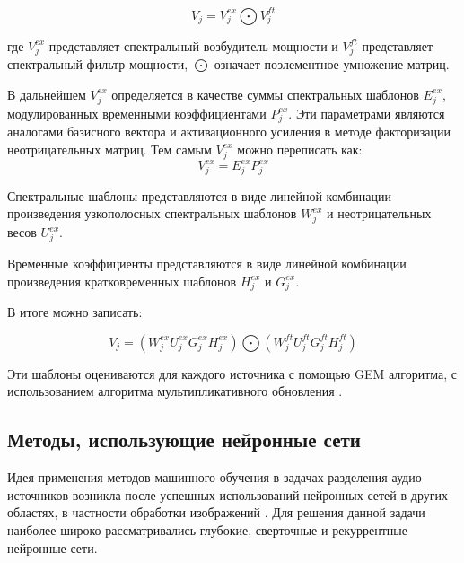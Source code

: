 \begin{equation}
V_j = V_j^{ex} \bigodot V_j^{ft}
\end{equation}

где $V_j^{ex}$ представляет спектральный возбудитель мощности и $V_j^{ft}$ представляет спектральный фильтр мощности, $\bigodot$ означает поэлементное умножение матриц.

В дальнейшем $V_j^{ex}$ определяется в качестве суммы спектральных шаблонов $E_j^{ex}$, модулированных 	временными коэффициентами $P_j^{ex}$. Эти параметрами являются аналогами базисного вектора и активационного усиления в методе факторизации неотрицательных матриц. Тем самым $V_j^{ex}$ можно переписать как:
\begin{equation}
V_j^{ex} = E_j^{ex}P_j^{ex}
\end{equation}

Спектральные шаблоны представляются в виде линейной комбинации произведения узкополосных спектральных шаблонов $W_j^{ex}$ и неотрицательных весов $U_j^{ex}$.

Временные коэффициенты представляются в виде линейной комбинации произведения кратковременных шаблонов $H_j^{ex}$ и $G_j^{ex}$.

В итоге можно записать:

\begin{equation}
V_j = (W_j^{ex}U_j^{ex}G_j^{ex}H_j^{ex}) \bigodot (W_j^{ft}U_j^{ft}G_j^{ft}H_j^{ft})
\end{equation}

Эти шаблоны оцениваются для каждого источника с помощью GEM алгоритма, с использованием алгоритма мультипликативного обновления \cite{DLee}.

\subsection{Методы, использующие нейронные сети}

Идея применения методов машинного обучения в задачах разделения аудио источников возникла после успешных использований нейронных сетей в других областях, в частности обработки изображений \cite{[Krizhevsky}. Для решения данной задачи наиболее широко рассматривались глубокие\cite{[Grais}, сверточные\cite{[Chandna} и рекуррентные\cite{[Huang} нейронные сети.




